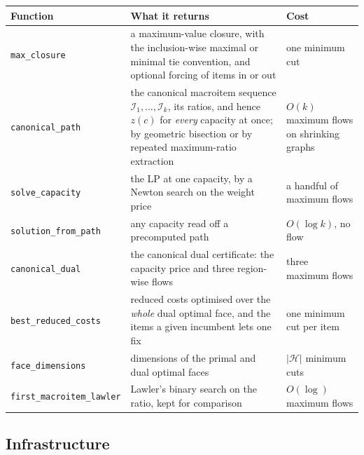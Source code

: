 \documentclass[11pt,a4paper]{article}
\newcommand{\code}[1]{\texttt{#1}}
\begin{document}
\begin{longtable}{@{}p{}p{}p{}@{}}
\toprule
\textbf{Function} & \textbf{What it returns} & \textbf{Cost}\\
\midrule
\endhead
\code{max\_closure} & a maximum-value closure, with the inclusion-wise
maximal or minimal tie convention, and optional forcing of items in or out &
one minimum cut\\
\addlinespace
\code{canonical\_path} & the canonical macroitem sequence
$\mathcal I_1,\dots,\mathcal I_k$, its ratios, and hence $z(c)$ for
\emph{every} capacity at once; by geometric bisection or by repeated
maximum-ratio extraction & $O(k)$ maximum flows on shrinking graphs\\
\addlinespace
\code{solve\_capacity} & the LP at one capacity, by a Newton search on the
weight price & a handful of maximum flows\\
\addlinespace
\code{solution\_from\_path} & any capacity read off a precomputed path &
$O(\log k)$, no flow\\
\addlinespace
\code{canonical\_dual} & the canonical dual certificate: the capacity price
and three region-wise flows & three maximum flows\\
\addlinespace
\code{best\_reduced\_costs} & reduced costs optimised over the \emph{whole}
dual optimal face, and the items a given incumbent lets one fix &
one minimum cut per item\\
\addlinespace
\code{face\_dimensions} & dimensions of the primal and dual optimal faces &
$|\mathcal H|$ minimum cuts\\
\addlinespace
\code{first\_macroitem\_lawler} & Lawler's binary search on the ratio, kept
for comparison & $O(\log)$ maximum flows\\
\bottomrule
\end{longtable}

\subsection{Infrastructure}
\end{document}
